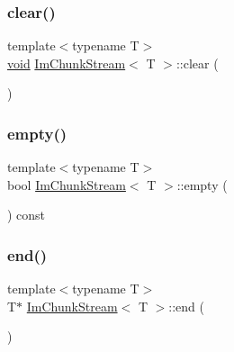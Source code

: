 \mbox{\label{structImChunkStream_a3bf3babbba7a8edafce99be0589379a3}} 
\subsubsection{\texorpdfstring{clear()}{clear()}}
{\footnotesize\ttfamily template$<$typename T$>$ \\
\hyperlink{imgui__impl__opengl3__loader_8h_ac668e7cffd9e2e9cfee428b9b2f34fa7}{void} \hyperlink{structImChunkStream}{Im\+Chunk\+Stream}$<$ T $>$\+::clear (\begin{DoxyParamCaption}{ }\end{DoxyParamCaption})\hspace{0.3cm}{\ttfamily [inline]}}

\mbox{\label{structImChunkStream_aef1d3eeb4c1aa2980da6a14ae96d2499}} 
\subsubsection{\texorpdfstring{empty()}{empty()}}
{\footnotesize\ttfamily template$<$typename T$>$ \\
bool \hyperlink{structImChunkStream}{Im\+Chunk\+Stream}$<$ T $>$\+::empty (\begin{DoxyParamCaption}{ }\end{DoxyParamCaption}) const\hspace{0.3cm}{\ttfamily [inline]}}

\mbox{\label{structImChunkStream_a4dd3a6cf7c30406b0fe1ee5e99ab2084}} 
\subsubsection{\texorpdfstring{end()}{end()}}
{\footnotesize\ttfamily template$<$typename T$>$ \\
T$\ast$ \hyperlink{structImChunkStream}{Im\+Chunk\+Stream}$<$ T $>$\+::end (\begin{DoxyParamCaption}{ }\end{DoxyParamCaption})\hspace{0.3cm}{\ttfamily [inline]}}

